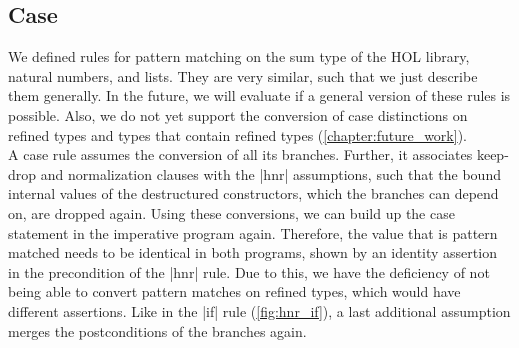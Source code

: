 \subsection{Case}\label{section:hnr_case}

We defined rules for pattern matching on the sum type of the HOL library, natural numbers, and lists. They are very similar, such that we just describe them generally. In the future, we will evaluate if a general version of these rules is possible. Also, we do not yet support the conversion of case distinctions on refined types and types that contain refined types (\autoref{chapter:future_work}).\\
A case rule assumes the conversion of all its branches. Further, it associates keep-drop and normalization clauses with the |hnr| assumptions, such that the bound internal values of the destructured constructors, which the branches can depend on, are dropped again. Using these conversions, we can build up the case statement in the imperative program again. Therefore, the value that is pattern matched needs to be identical in both programs, shown by an identity assertion in the precondition of the |hnr| rule. Due to this, we have the deficiency of not being able to convert pattern matches on refined types, which would have different assertions.
Like in the |if| rule (\autoref{fig:hnr_if}), a last additional assumption merges the postconditions of the branches again.

